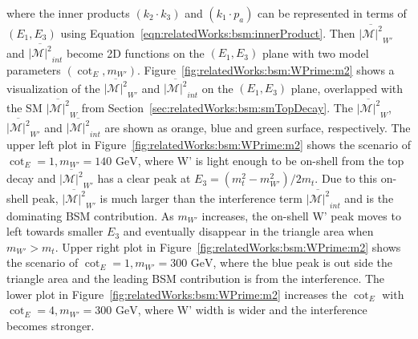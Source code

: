 \noindent where the inner products $(  k_2 \cdot k_3)$ and $ (  k_1 \cdot p_a) $ can be represented in terms of $(E_1,E_3)$ using Equation~\ref{eqn:relatedWorks:bsm:innerProduct}. Then $\overline{ |\mathcal{M}|^2 } _{W'} $ and $\overline{ |\mathcal{M}|^2 } _{int}$ become 2D functions on the $(E_1,E_3)$ plane with two model parameters $(\cot_E, m_{W'})$.  Figure~\ref{fig:relatedWorks:bsm:WPrime:m2} shows a visualization of the $\overline{ |\mathcal{M}|^2 } _{W'} $ and $\overline{ |\mathcal{M}|^2 } _{int}$ on the $(E_1,E_3)$ plane, overlapped with the SM $\overline{ |\mathcal{M}|^2 } _{W}$ from Section~\ref{sec:relatedWorks:bsm:smTopDecay}. The $\overline{ |\mathcal{M}|^2 } _{W}$, $\overline{ |\mathcal{M}|^2 } _{W'} $ and $\overline{ |\mathcal{M}|^2 } _{int}$ are shown as orange, blue and green surface, respectively. The upper left plot in Figure~\ref{fig:relatedWorks:bsm:WPrime:m2} shows the scenario of
$\cot_E=1, m_{W'}=140 \text{ GeV}$, where W' is light enough to be on-shell from the top decay and  $\overline{ |\mathcal{M}|^2 } _{W'} $ has a clear peak at $E_3 = (m^2_t - m^2_{W'})/2 m_t $. Due to this on-shell peak,  $\overline{ |\mathcal{M}|^2 } _{W'} $ is much larger than the interference term  $\overline{ |\mathcal{M}|^2 } _{int}$  and is the dominating BSM contribution. As $m_{W'}$ increases, the on-shell W' peak moves to left towards smaller $E_3$ and eventually disappear in the triangle area when $m_{W'} > m_{t}$. Upper right plot in Figure~\ref{fig:relatedWorks:bsm:WPrime:m2} shows the scenario of $\cot_E=1, m_{W'}=300 \text{ GeV}$, where the blue peak is out side the triangle area and the leading BSM contribution is from the interference. The lower plot in Figure~\ref{fig:relatedWorks:bsm:WPrime:m2} increases the $\cot_E$  with $\cot_E=4, m_{W'}=300 \text{ GeV}$, where W' width is wider and the interference becomes stronger. 





